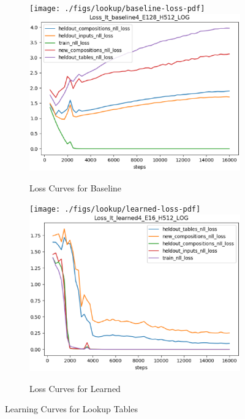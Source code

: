 \begin{figure}[ht] 
	\begin{subfigure}[b]{0.5\linewidth}
		\centering
		\ifpdf
		\texttt{[image: ./figs/lookup/baseline-loss-pdf]}
		\else
		\includegraphics[width=0.95\linewidth]{./figs/lookup/baseline-loss-eps}
		\fi
		\caption{Loss Curves for Baseline} 
		\label{lt_baseline} 
		\vspace{2ex}
	\end{subfigure}%
	\begin{subfigure}[b]{0.5\linewidth}
		\centering
		\ifpdf
		\texttt{[image: ./figs/lookup/learned-loss-pdf]}
		\else
		\includegraphics[width=0.95\linewidth]{./figs/lookup/learned-loss-eps}
		\fi 
		\caption{Loss Curves for Learned} 
		\label{lt_learned} 
		\vspace{2ex}
	\end{subfigure}
	\caption{Learning Curves for Lookup Tables}
	\label{lt_learning_curves}
\end{figure}

